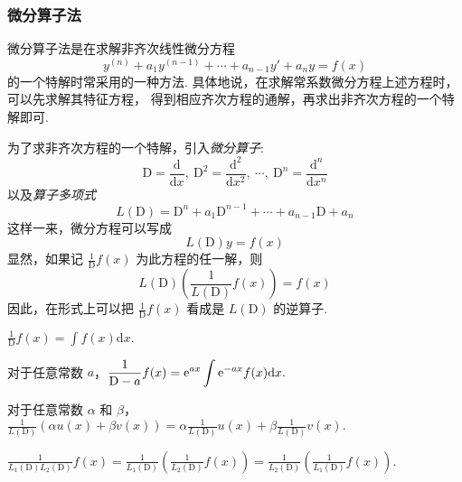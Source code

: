 \subsubsection{微分算子法}

微分算子法是在求解非齐次线性微分方程 $$y^{(n)}+a_1y^{(n-1)}+\cdots+a_{n-1}y'+a_ny=f(x)$$
的一个特解时常采用的一种方法. 具体地说，在求解常系数微分方程上述方程时，可以先求解其特征方程，
得到相应齐次方程的通解，再求出非齐次方程的一个特解即可.

\begin{definition}[微分算子]
    为了求非齐次方程的一个特解，引入\textit{微分算子}:
    $$\mathrm{D}=\frac{\mathrm{d}}{\mathrm{d}x},~\mathrm{D}^2=\frac{\mathrm{d^2}}{\mathrm{d}x^2},~\cdots,~\mathrm{D}^n=\frac{\mathrm{d}^n}{\mathrm{d}x^n}$$
    以及\textit{算子多项式} $$L(\mathrm{D})=\mathrm{D}^n+a_1\mathrm{D}^{n-1}+\cdots+a_{n-1}\mathrm{D}+a_n$$
    这样一来，微分方程可以写成 $$L(\mathrm{D})y=f(x)$$
    显然，如果记 $\displaystyle\frac{1}{\mathrm{D}}f(x)$ 为此方程的任一解，则
    $$L(\mathrm{D})\left(\frac{1}{L(\mathrm{D})}f(x)\right)=f(x)$$
    因此，在形式上可以把 $\displaystyle\frac{1}{\mathrm{D}}f(x)$ 看成是 $L(\mathrm{D})$ 的逆算子.
\end{definition}

\begin{theorem}
    $\displaystyle\frac{1}{\mathrm{D}}f(x)=\int f(x)\mathrm{d}x.$
\end{theorem}
\begin{theorem}
    对于任意常数 $a$，$\displaystyle\frac{1}{\mathrm{D}-a}f(x)=\mathrm{e} ^{ax}\int\mathrm{e} ^{-ax}f(x)\mathrm{d}x.$
\end{theorem}
\begin{theorem}
    对于任意常数 $\alpha$ 和 $\beta$，$\displaystyle\frac{1}{L(\mathrm{D})}(\alpha u(x)+\beta v(x))=\alpha\frac{1}{L(\mathrm{D})}u(x)+\beta\frac{1}{L(\mathrm{D})}v(x).$
\end{theorem}
\begin{theorem}
    $\displaystyle\frac{1}{L_1(\mathrm{D})L_2(\mathrm{D})}f(x)=\frac{1}{L_1(\mathrm{D})}\left(\frac{1}{L_2(\mathrm{D})}f(x)\right)=\frac{1}{L_2(\mathrm{D})}\left(\frac{1}{L_1(\mathrm{D})}f(x)\right).$
\end{theorem}

